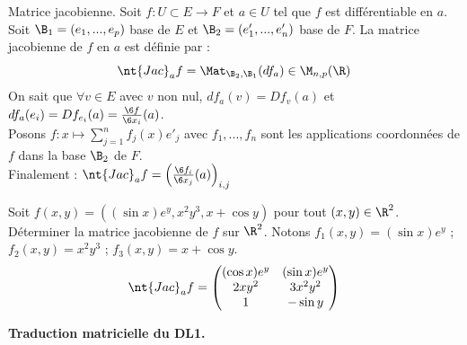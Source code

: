 \documentclass[11pt]{article}
\newcommand*{\Jac}{\nt{Jac}}
\begin{document}
\begin{defi}{Matrice jacobienne.}{}
    Soit $f:U\subset E\to F$ et $a\in U$ tel que $f$ est différentiable en $a$.\\
    Soit $\B_1=(e_1,...,e_p)$ base de $E$ et $\B_2=(e_1',...,e'_n)$ base de $F$. La matrice jacobienne de $f$ en $a$ est définie par :
    \begin{equation*}
        \Jac_a f = \Mat_{\B_2,\B_1}(df_a) \in \M_{n,p}(\R)
    \end{equation*}
    \tcblower
    On sait que $\forall v \in E$ avec $v$ non nul, $df_a(v) = Df_v(a)$ et $df_a(e_i)=Df_{e_i}(a)=\frac{\6 f}{\6 x_i}(a)$.\\
    Posons $f:x\mapsto \sum_{j=1}^nf_j(x)e'_j$ avec $f_1,...,f_n$ sont les applications coordonnées de $f$ dans la base $\B_2$ de $F$.\\
    Finalement : $\Jac_a f = \left( \frac{\6 f_i}{\6 x_j}(a) \right)_{i,j}$
\end{defi}

\begin{ex}{}{}
    Soit $f(x,y)=((\sin x)e^y,x^2y^3,x+\cos y)$ pour tout $(x,y)\in\R^2$.\\
    Déterminer la matrice jacobienne de $f$ sur $\R^2$.
    \tcblower
    Notons $f_1(x,y)=(\sin x)e^y$ ; $f_2(x,y)=x^2y^3$ ; $f_3(x,y)=x+\cos y$.
    \begin{equation*}
        \Jac_af=\begin{pmatrix} (\cos x)e^y & (\sin x)e^y \\ 2xy^2 & 3x^2y^2 \\ 1 & -\sin y\end{pmatrix}
    \end{equation*}
\end{ex}

\bf{Traduction matricielle du DL1.}
\end{document}
